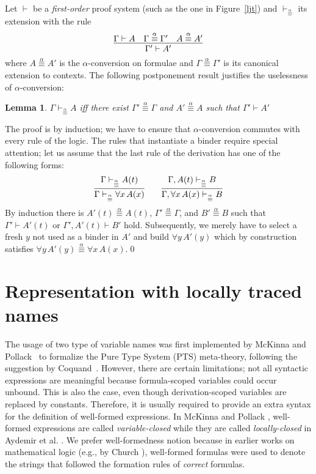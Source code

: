 \documentclass{svjour3}                     %
\newtheorem{lem}[thm]{Lemma}
\newcommand{\seq}[2]{\infer{#2}{#1}}
\begin{document}
Let $\vdash$ be a {\em first-order} proof system (such as the one in
Figure~\ref{ljt}) and $\vdash_{\stackrel{\alpha}{\equiv}}$ its
extension with the rule
$$
\seq{\Gamma \vdash A \quad \Gamma \stackrel{\alpha}{\equiv} \Gamma'\quad
     A \stackrel{\alpha}{\equiv} A'}
    {\Gamma' \vdash A'}
$$ where $A \stackrel{\alpha}{\equiv} A'$ is the $\alpha$-conversion on
    formulae and $\Gamma \stackrel{\alpha}{\equiv} \Gamma'$ is its
    canonical extension to contexts. The following postponement result
    justifies the uselessness of $\alpha$-conversion:

\begin{lem}
$\Gamma \vdash_{\stackrel{\alpha}{\equiv}} A$ iff there exist
  $\Gamma' \stackrel{\alpha}{\equiv} \Gamma$ and $A'
  \stackrel{\alpha}{\equiv} A$ such that $\Gamma' \vdash A'$
\end{lem}

The proof is by induction;  we  have to ensure that
$\alpha$-conversion commutes with every rule of the logic. The rules
that instantiate a binder require special attention; let us
assume that the last rule of the derivation has one of the following forms:
$$
\seq{\Gamma \vdash_{\stackrel{\alpha}{\equiv}} A(t)}
    {\Gamma \vdash_{\stackrel{\alpha}{\equiv}} \forall x\, A(x)}
\qquad
\seq{\Gamma, A(t) \vdash_{\stackrel{\alpha}{\equiv}} B}
    {\Gamma, \forall x\, A(x) \vdash_{\stackrel{\alpha}{\equiv}} B}
$$
By induction there is $A'(t) \stackrel{\alpha}{\equiv} A(t)$,
$\Gamma' \stackrel{\alpha}{\equiv} \Gamma$, and $B' \stackrel{\alpha}{\equiv} B$
such that
$\Gamma' \vdash A'(t)$ or $\Gamma', A'(t) \vdash B'$
hold.
Subsequently, we merely have to select a fresh $y$ not used as a binder in $A'$ and build
$\forall y\, A'(y)$
which by construction satisfies
$\forall y\, A'(y) \stackrel{\alpha}{\equiv} \forall x\, A(x)$.\qed

\section{Representation with locally traced names}\label{sec:locally}
The usage of two type of variable names was first implemented by McKinna and Pollack~\cite{mcpol93,mcpol99} to formalize the Pure Type System (PTS) meta-theory, following the suggestion by Coquand~\cite{Coquand91}. However, there are certain limitations; not all syntactic expressions are meaningful because formula-scoped variables could occur unbound. This is also the case, even though derivation-scoped variables are replaced by constants. Therefore, it is usually required to provide an extra syntax for the definition of well-formed expressions.
In McKinna and Pollack \cite{mcpol93,mcpol99}, well-formed expressions are called \textit{variable-closed} while they are called \textit{locally-closed} in Aydemir et al. \cite{engineering}. We prefer well-formedness notion because in earlier works on mathematical logic (e.g., by Church \cite{church96}), well-formed formulas were used to denote the strings that followed the formation rules of \emph{correct} formulas.
\end{document}
